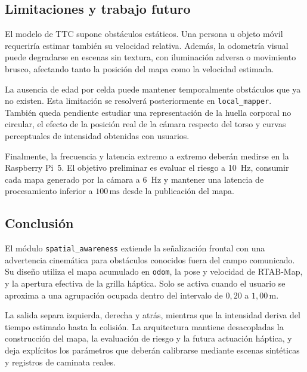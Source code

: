 \subsection{Limitaciones y trabajo futuro}
\label{subsec:sa-future}

El modelo de TTC supone obstáculos estáticos. Una persona u objeto móvil
requeriría estimar también su velocidad relativa. Además, la odometría visual
puede degradarse en escenas sin textura, con iluminación adversa o movimiento
brusco, afectando tanto la posición del mapa como la velocidad estimada.

La ausencia de edad por celda puede mantener temporalmente obstáculos que ya
no existen. Esta limitación se resolverá posteriormente en
\texttt{local\_mapper}. También queda pendiente estudiar una representación de
la huella corporal no circular, el efecto de la posición real de la cámara
respecto del torso y curvas perceptuales de intensidad obtenidas con usuarios.

Finalmente, la frecuencia y latencia extremo a extremo deberán medirse en la
Raspberry Pi~5. El objetivo preliminar es evaluar el riesgo a 10~Hz, consumir
cada mapa generado por la cámara a 6~Hz y mantener una latencia de
procesamiento inferior a $100\,\text{ms}$ desde la publicación del mapa.

\subsection{Conclusión}
\label{subsec:sa-conclusion}

El módulo \texttt{spatial\_awareness} extiende la señalización frontal con una
advertencia cinemática para obstáculos conocidos fuera del campo comunicado.
Su diseño utiliza el mapa acumulado en \texttt{odom}, la pose y velocidad de
RTAB-Map, y la apertura efectiva de la grilla háptica. Solo se activa cuando
el usuario se aproxima a una agrupación ocupada dentro del intervalo de
$0{,}20$ a $1{,}00\,\text{m}$.

La salida separa izquierda, derecha y atrás, mientras que la intensidad deriva
del tiempo estimado hasta la colisión. La arquitectura mantiene desacopladas
la construcción del mapa, la evaluación de riesgo y la futura actuación
háptica, y deja explícitos los parámetros que deberán calibrarse mediante
escenas sintéticas y registros de caminata reales.
